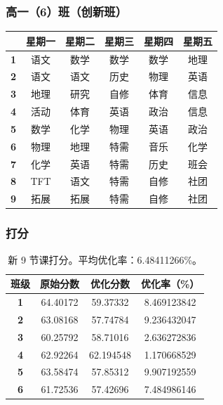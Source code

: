 \documentclass[a4paper]{article}
\begin{document}
  \subsubsection{高一（6）班（创新班）}

   \begin{tabular}{cccccc}
   \toprule
   & \bf 星期一 & \bf 星期二 & \bf 星期三 & \bf 星期四 & \bf 星期五 \\
   \midrule
   \bf 1 & 语文 & 数学 & 数学 & 数学 & 地理 \\
   \bf 2 & 语文 & 语文 & 历史 & 物理 & 英语 \\
   \bf 3 & 地理 & 研究 & 自修 & 体育 & 信息 \\
   \bf 4 & 活动 & 体育 & 英语 & 政治 & 信息 \\
   \bf 5 & 数学 & 化学 & 物理 & 英语 & 政治 \\
   \midrule
   \bf 6 & 物理 & 地理 & 特需 & 音乐 & 化学 \\
   \bf 7 & 化学 & 英语 & 特需 & 历史 & 班会 \\
   \bf 8 & TFT  & 语文 & 特需 & 自修 & 社团 \\
   \bf 9 & 拓展 & 拓展 & 特需 & 自修 & 社团 \\
   \bottomrule
   \end{tabular}

  \subsubsection{打分}

   \begin{table}[H]
   \centering
   \begin{tabular}{cccc}
   \toprule
   \bf 班级 & \bf 原始分数 & \bf 优化分数 & \bf 优化率（\%）\\
   \midrule
   \bf 1 & 64.40172 & 59.37332 & 8.469123842 \\
   \bf 2 & 63.08168 & 57.74784 & 9.236432047 \\
   \bf 3 & 60.25792 & 58.71016 & 2.636272836 \\
   \bf 4 & 62.92264 & 62.194548 & 1.170668529 \\
   \bf 5 & 63.58474 & 57.85312 & 9.907192559 \\
   \bf 6 & 61.72536 & 57.42696 & 7.484986146 \\
   \bottomrule
   \end{tabular}
   \caption{新 9 节课打分。平均优化率：6.48411266\%。}
   \end{table}
\end{document}
